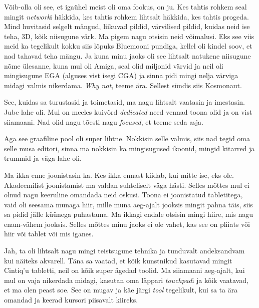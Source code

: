 Võib-olla oli see, et igaühel meist oli oma fookus, on ju. Kes tahtis rohkem seal mingit \emph{network}i häkkida, kes tahtis rohkem lihtsalt häkkida, kes tahtis progeda. Mind huvitasid selgelt mängud, liikuvad pildid, värvilised pildid, kuidas neid ise teha, 3D, kõik niisugune värk. Ma pigem nagu otsisin neid võimalusi. Eks see viis meid ka tegelikult kokku siis lõpuks Bluemooni pundiga, kellel oli  kindel soov, et nad tahavad teha mängu. Ja kuna minu jaoks oli see lihtsalt natukene niisugune nõme ülesanne, kuna mul oli Amiga, seal olid miljonid värvid ja neil oli mingisugune EGA (alguses vist isegi CGA) ja sinna pidi mingi nelja värviga midagi valmis nikerdama. \emph{Why not}, teeme ära. Sellest sündis siis Kosmonaut. 

See, kuidas sa turustasid ja toimetasid, ma nagu lihtsalt vaatasin ja imestasin. Jube lahe oli. Mul on meeles kuivõrd \emph{dedicated} need vennad toona olid ja on vist siiamaani. Nad olid nagu tõesti nagu \emph{focused}, et teeme seda asja. 

Aga see graafiline pool oli super lihtne. Nokkisin selle valmis, siis nad tegid oma selle musa editori, sinna ma nokkisin ka mingisugused ikoonid, mingid kitarred ja  trummid ja väga lahe oli.


Ma ikka enne joonistasin ka. Kes ikka ennast kiidab, kui mitte ise, eks ole. Akadeemilist joonistamist ma valdan  suhteliselt väga hästi. Selles mõttes mul ei olnud nagu keeruline omandada neid oskusi. Toona ei joonistatud tabletitega, vaid oli seesama munaga hiir, mille muna aeg-ajalt jooksis mingit pahna täis, siis sa pidid jälle küünega puhastama. Ma ikkagi endale otsisin mingi hiire, mis nagu enam-vähem jooksis. Selles mõttes minu jaoks ei ole vahet, kas see on pliiats või hiir või tablet või mis iganes. 


Jah, ta oli lihtsalt nagu mingi teistsugune tehnika ja tunduvalt andeksandvam kui näiteks akvarell. Täna sa vaatad, et  kõik kunstnikud kasutavad mingit Cintiq'u tabletti, neil on kõik super ägedad toolid. Ma siiamaani aeg-ajalt, kui mul on vaja nikerdada midagi, kasutan oma läppari \emph{touchpad}i ja kõik vaatavad, et ma olen peast soe. See on mugav ja käe järgi \emph{tool} tegelikult, kui sa ta ära omandad ja keerad kursori piisavalt kiireks.

